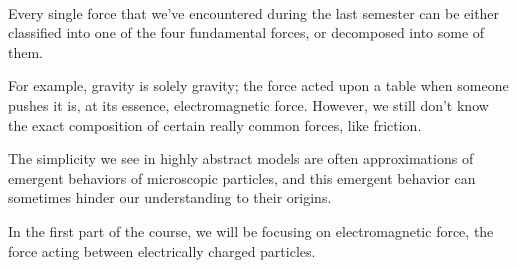 \begin{remark}
    \ \\Every single force that we've encountered during the last semester can be either classified into one of the four fundamental forces, or decomposed into some of them.\par For example, gravity is solely gravity; the force acted upon a table when someone pushes it is, at its essence, electromagnetic force. However, we still don't know the exact composition of certain really common forces, like friction.\par The simplicity we see in highly abstract models are often approximations of emergent behaviors of microscopic particles, and this emergent behavior can sometimes hinder our understanding to their origins.
\end{remark}
In the first part of the course, we will be focusing on electromagnetic force, the force acting between electrically charged particles.


